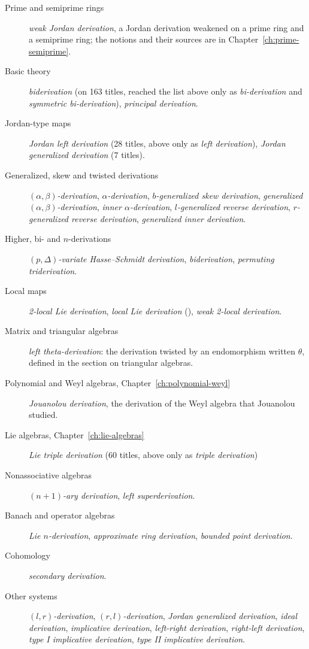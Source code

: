 \begin{description}
  \item[Prime and semiprime rings] \emph{weak Jordan derivation}, a Jordan
    derivation weakened on a prime ring and a semiprime ring; the notions and
    their sources are in Chapter~\ref{ch:prime-semiprime}.
  \item[Basic theory] \emph{biderivation} (on 163 titles, reached the list
    above only as \emph{bi-derivation} and \emph{symmetric bi-derivation}),
    \emph{principal derivation}.
  \item[Jordan-type maps] \emph{Jordan left derivation} (28 titles, above only
    as \emph{left derivation}), \emph{Jordan generalized derivation} (7 titles).
  \item[Generalized, skew and twisted derivations]
    \emph{$(\alpha,\beta)$-derivation}, \emph{$\alpha$-derivation},
    \emph{$b$-generalized skew derivation},
    \emph{generalized $(\alpha,\beta)$-derivation},
    \emph{inner $\alpha$-derivation}, \emph{$l$-generalized reverse derivation},
    \emph{$r$-generalized reverse derivation},
    \emph{generalized inner derivation}.
  \item[Higher, bi- and $n$-derivations]
    \emph{$(p,\Delta)$-variate Hasse--Schmidt derivation}, \emph{biderivation},
    \emph{permuting triderivation}.
  \item[Local maps] \emph{2-local Lie derivation}, \emph{local Lie derivation}
    (\cite[Theorem~1, p.~183]{Martindale1964}),
    \emph{weak 2-local derivation}.
  \item[Matrix and triangular algebras]
    \emph{left theta-derivation}: the derivation twisted by an
    endomorphism written $\theta$, defined in the section on triangular
    algebras.
  \item[Polynomial and Weyl algebras, Chapter~\ref{ch:polynomial-weyl}]
    \emph{Jouanolou derivation}, the derivation of the Weyl algebra that
    Jouanolou studied.
  \item[Lie algebras, Chapter~\ref{ch:lie-algebras}]
    \emph{Lie triple derivation} (60 titles, above only as
    \emph{triple derivation})
  \item[Nonassociative algebras] \emph{$(n+1)$-ary derivation},
    \emph{left superderivation}.
  \item[Banach and operator algebras] \emph{Lie $n$-derivation},
    \emph{approximate ring derivation}, \emph{bounded point derivation}.
  \item[Cohomology] \emph{secondary derivation}.
  \item[Other systems] \emph{$(l,r)$-derivation}, \emph{$(r,l)$-derivation},
    \emph{Jordan generalized derivation}, \emph{ideal derivation},
    \emph{implicative derivation}, \emph{left-right derivation},
    \emph{right-left derivation}, \emph{type I implicative derivation},
    \emph{type II implicative derivation}.
\end{description}

